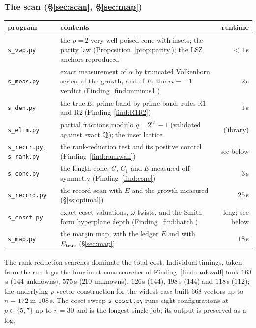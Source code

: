 \subsubsection*{The scan (\S\ref{sec:scan}, \S\ref{sec:map})}
\begin{center}
\scriptsize\setlength{\tabcolsep}{4pt}
\begin{tabular}{lp{}r}
\toprule
program & contents & runtime\\
\midrule
\texttt{s\_vwp.py} & the $p=2$ very-well-poised cone with insets; the parity law
  (Proposition~\ref{prop:parity}); the LSZ anchors reproduced & $<1$\,s\\
\texttt{s\_meas.py} & exact measurement of $\alpha$ by truncated Volkenborn series, of the
  growth, and of $E$; the $m=-1$ verdict (Finding~\ref{find:mminus1}) & $2$\,s\\
\texttt{s\_den.py} & the true $E$, prime band by prime band; rules R1 and R2
  (Finding~\ref{find:R1R2}) & $1$\,s\\
\texttt{s\_elim.py} & partial fractions modulo $q=2^{61}-1$ (validated against exact $\mathbb{Q}$);
  the inset lattice & (library)\\
\texttt{s\_recur.py}, \texttt{s\_rank.py} & the rank-reduction test and its positive control
  (Finding~\ref{find:rankwall}) & see below\\
\texttt{s\_cone.py} & the length cone: $G$, $C_1$ and $E$ measured off symmetry
  (Finding~\ref{find:cone}) & $3$\,s\\
\texttt{s\_record.py} & the record scan with $E$ and the growth measured
  (\S\ref{ss:optimal}) & $25$\,s\\
\texttt{s\_coset.py} & exact coset valuations, $\omega$-twists, and the Smith-form hyperplane
  depth (Finding~\ref{find:hatch}) & long; see below\\
\texttt{s\_map.py} & the margin map, with the ledger $E$ and with $E_{\mathrm{true}}$
  (\S\ref{sec:map}) & $18$\,s\\
\bottomrule
\end{tabular}
\end{center}

The rank-reduction searches dominate the total cost. Individual timings, taken from the run
logs: the four inset-cone searches of Finding~\ref{find:rankwall} took $163$\,s ($144$
unknowns), $575$\,s ($210$ unknowns), $126$\,s ($144$), $198$\,s ($144$) and $118$\,s
($112$); the underlying $\rho$-vector construction for the widest case built $668$ vectors up
to $n=172$ in $108$\,s. The coset sweep \texttt{s\_coset.py} runs eight configurations at
$p\in\{5,7\}$ up to $n=30$ and is the longest single job; its output is preserved as a log.

